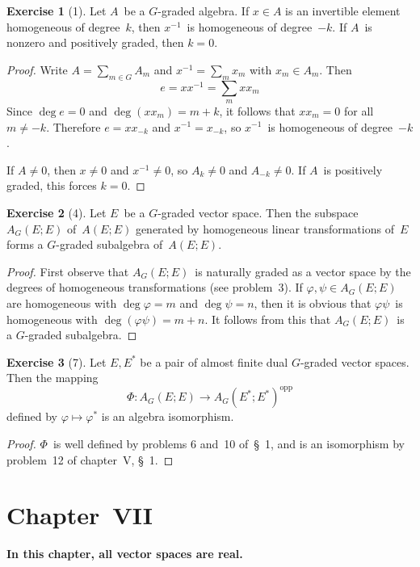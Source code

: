 \documentclass[letterpaper,12pt]{article}
\newcommand{\opp}[1]{#1^{\mathrm{opp}}}
\theoremstyle{definition}
\newtheorem*{exer}{Exercise}
\theoremstyle{remark}
\begin{document}
\begin{exer}[1]
Let \(A\)~be a \(G\)-graded algebra. If \(x\in A\) is an invertible element homogeneous of degree~\(k\), then \(x^{-1}\)~is homogeneous of degree~\(-k\). If \(A\)~is nonzero and positively graded, then \(k=0\).
\end{exer}
\begin{proof}
Write \(A=\sum_{m\in G}A_m\) and \(x^{-1}=\sum_m x_m\) with \(x_m\in A_m\). Then
\[e=xx^{-1}=\sum_m xx_m\]
Since \(\deg e=0\) and \(\deg(xx_m)=m+k\), it follows that \(xx_m=0\) for all \(m\ne-k\). Therefore \(e=xx_{-k}\) and \(x^{-1}=x_{-k}\), so \(x^{-1}\)~is homogeneous of degree~\(-k\).

If \(A\ne 0\), then \(x\ne 0\) and \(x^{-1}\ne 0\), so \(A_k\ne 0\) and \(A_{-k}\ne 0\). If \(A\)~is positively graded, this forces \(k=0\).
\end{proof}

\begin{exer}[4]
Let \(E\)~be a \(G\)-graded vector space. Then the subspace \(A_G(E;E)\) of~\(A(E;E)\) generated by homogeneous linear transformations of~\(E\) forms a \(G\)-graded subalgebra of~\(A(E;E)\).
\end{exer}
\begin{proof}
First observe that \(A_G(E;E)\)~is naturally graded as a vector space by the degrees of homogeneous transformations (see problem~3). If \(\varphi,\psi\in A_G(E;E)\) are homogeneous with \(\deg\varphi=m\) and \(\deg\psi=n\), then it is obvious that \(\varphi\psi\)~is homogeneous with \(\deg(\varphi\psi)=m+n\). It follows from this that \(A_G(E;E)\)~is a \(G\)-graded subalgebra.
\end{proof}

\begin{exer}[7]
Let \(E,E^*\) be a pair of almost finite dual \(G\)-graded vector spaces. Then the mapping
\[\Phi:A_G(E;E)\to\opp{A_G(E^*;E^*)}\]
defined by \(\varphi\mapsto\varphi^*\) is an algebra isomorphism.
\end{exer}
\begin{proof}
\(\Phi\)~is well defined by problems 6 and~10 of~\S~1, and is an isomorphism by problem~12 of chapter~V, \S~1.
\end{proof}

\section*{Chapter~VII}
\textbf{In this chapter, all vector spaces are real.}
\end{document}
